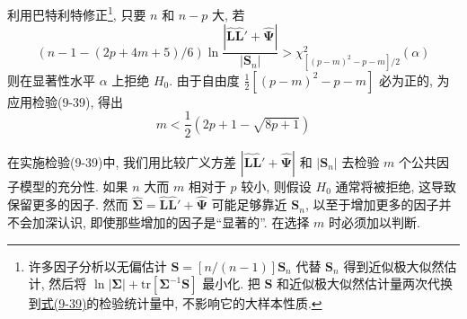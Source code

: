 利用巴特利特修正\footnote{{\footnotesize 许多因子分析以无偏估计 $\mathbf{S}=[n/(n-1)]\mathbf{S}_n$ 代替 $\mathbf{S}_n$ 得到近似极大似然估计, 然后将 $\ln|\boldsymbol{\Sigma}|+\mathrm{tr}[\boldsymbol{\Sigma}^{-1}\mathbf{S}]$ 最小化. 把 $\mathbf{S}$ 和近似极大似然估计量两次代换到\hyperref[eq:9-39]{式(9-39)}的检验统计量中, 不影响它的大样本性质.}}, 只要 $n$ 和 $n-p$ 大, 若
\label{eq:9-39}
\begin{equation}
(n-1-(2p+4m+5)/6)\ln\frac{|\hat{\mathbf{L}}\hat{\mathbf{L}}'+\hat{\boldsymbol{\Psi}}|}{|\mathbf{S}_n|}>\chi^2_{[(p-m)^2-p-m]/2}(\alpha) \tag{9-39}
\end{equation}
则在显著性水平 $\alpha$ 上拒绝 $H_0$. 由于自由度 $\frac{1}{2}[(p-m)^2-p-m]$ 必为正的, 为应用检验(9-39), 得出
\label{eq:9-40}
\begin{equation}
m<\frac{1}{2}(2p+1-\sqrt{8p+1}) \tag{9-40}
\end{equation}

\quad 在实施检验(9-39)中, 我们用比较广义方差 $|\hat{\mathbf{L}}\hat{\mathbf{L}}'+\hat{\boldsymbol{\Psi}}|$ 和 $|\mathbf{S}_n|$ 去检验 $m$ 个公共因子模型的充分性. 如果 $n$ 大而 $m$ 相对于 $p$ 较小, 则假设 $H_0$ 通常将被拒绝, 这导致保留更多的因子. 然而 $\hat{\boldsymbol{\Sigma}}=\hat{\mathbf{L}}\hat{\mathbf{L}}'+\hat{\boldsymbol{\Psi}}$ 可能足够靠近 $\mathbf{S}_n$, 以至于增加更多的因子并不会加深认识, 即使那些增加的因子是“显著的”. 在选择 $m$ 时必须加以判断.
